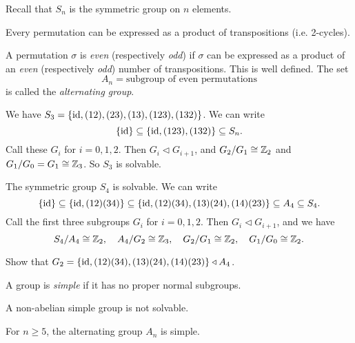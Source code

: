 \begin{remark}
  Recall that $S_n$ is the symmetric group on $n$
  elements.
\end{remark}

\begin{theorem}
  Every permutation can be expressed as a product of
  transpositions (i.e. 2-cycles).
\end{theorem}

\begin{definition}
  A permutation $\sigma$ is \emph{even} (respectively \emph{odd})
  if $\sigma$ can be expressed as a product of an
  \emph{even} (respectively \emph{odd}) number of transpositions.
  This is well defined. The set
  \[
    A_n = \text{subgroup of even permutations}
  \]
  is called the \emph{alternating group}.
\end{definition}

\begin{example}
  We have $S_3 = \{\mathrm{id}, (12), (23), (13), (123), (132)\}$.
  We can write
  \[
    \{\mathrm{id}\} \subseteq \{\mathrm{id}, (123), (132)\} \subseteq S_n.
  \]
  Call these $G_i$ for $i = 0, 1, 2$.
  Then $G_i \triangleleft G_{i + 1}$, and
  $G_2 / G_1 \cong \mathbb{Z}_2$ and $G_1 / G_0 = G_1 \cong \mathbb{Z}_3$.
  So $S_3$ is solvable.
\end{example}

\begin{example}
  The symmetric group $S_4$ is solvable. We can write
  \[
    \{\mathrm{id}\} \subseteq \{\mathrm{id}, (12)(34)\}
    \subseteq \{\mathrm{id}, (12)(34), (13)(24), (14)(23)\}
    \subseteq A_4 \subseteq S_4.
  \]
  Call the first three subgroups $G_i$ for $i = 0, 1, 2$.
  Then $G_i \triangleleft G_{i + 1}$, and we have
  \[
    S_4 / A_4 \cong \mathbb{Z}_2, \quad A_4 / G_2 \cong \mathbb{Z}_3,
    \quad G_2 / G_1 \cong \mathbb{Z}_2, \quad G_1 / G_0 \cong \mathbb{Z}_2.
  \]
\end{example}

\begin{exercise}
  Show that
  $G_2 = \{\mathrm{id}, (12)(34), (13)(24), (14)(23)\} \triangleleft A_4$.
\end{exercise}

\begin{definition}
  A group is \emph{simple} if it has no proper normal
  subgroups.
\end{definition}

\begin{remark}
  A non-abelian simple group is not solvable.
\end{remark}

\begin{theorem}
  For $n \ge 5$, the alternating group $A_n$ is simple.
\end{theorem}

